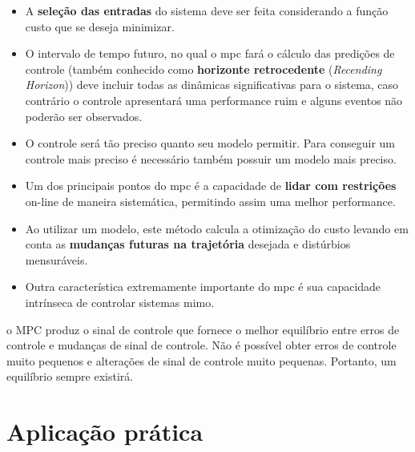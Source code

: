 \begin{itemize}
    \item A \textbf{seleção das entradas} do sistema deve ser feita considerando a função custo que se
            deseja minimizar.

    \item O intervalo de tempo futuro, no qual o \acrshort{mpc} fará o cálculo das predições de controle
            (também conhecido como \textbf{horizonte retrocedente} (\textit{Recending Horizon})) deve
            incluir todas as dinâmicas significativas para o sistema, caso contrário o controle apresentará
            uma performance ruim e alguns eventos não poderão ser observados.

    \item O controle será tão preciso quanto seu modelo permitir. Para conseguir um controle mais preciso
            é necessário também possuir um modelo mais preciso.

    \item Um dos principais pontos do \acrshort{mpc} é a capacidade de \textbf{lidar com restrições} on-line
            de maneira sistemática, permitindo assim uma melhor performance.

    \item Ao utilizar um modelo, este método calcula a otimização do custo levando em conta as
            \textbf{mudanças futuras na trajetória} desejada e distúrbios mensuráveis.

    \item Outra característica extremamente importante do \acrshort{mpc} é sua capacidade intrínseca de
            controlar sistemas \acrshort{mimo}.
    
\end{itemize}

o MPC produz o sinal de controle que fornece o melhor equilíbrio entre erros de controle e mudanças
de sinal de controle. Não é possível obter erros de controle muito pequenos e alterações de sinal de
controle muito pequenas. Portanto, um equilíbrio sempre existirá.

\section{Aplicação prática}
\label{sec:aplicacao_pratica}

